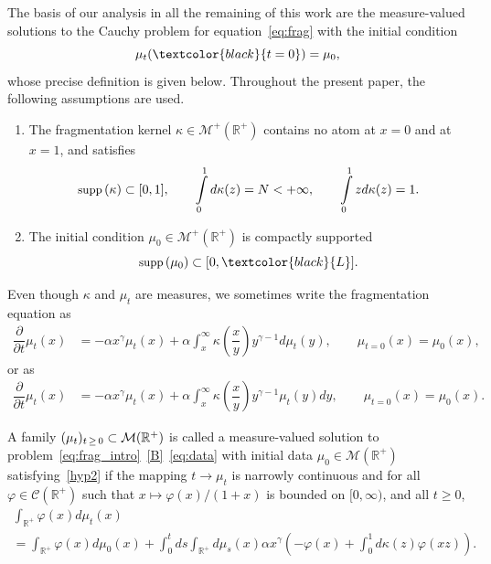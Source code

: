 \documentclass[AHL,Unicode,longabstracts,published]{cedram}
\newcommand*\dst{\displaystyle}
\newcommand*\p{\partial}
\renewcommand*\a{\alpha}
\newcommand*\R{\mathbb{R}}
\newcommand*\M{\mathcal{M}}
\newcommand{\clC}{\mathcal{C}}
\newcommand{\MT}[1]{\textcolor{black}{#1}}
\newcommand*\supp{{\mbox{\small\rm supp}}\,}
\newcommand*{\Hypenumi}{\renewcommand*{\theenumi}{\textbf{Hyp-\arabic{enumi}}}}
\begin{document}
The basis of our analysis in all the remaining of this work are the measure-valued solutions to the Cauchy problem for equation~\ref{eq:frag} with the initial condition
\begin{equation}\label{eq:data}
\mu _t(\MT{t=0})=\mu _0,
\end{equation}
whose precise definition is given below. Throughout the present paper, the following assumptions are used.
\begin{enumerate}\Hypenumi
\item \label{hyp1}
The fragmentation kernel $\kappa \in \M^+(\R^+)$ contains no atom at $x=0$ and at $x=1$, and satisfies
\begin{equation}
\supp(\kappa)\subset [0,1], \qquad \int\limits_0^1d\kappa(z) =N<+\infty, \qquad \int\limits_0^1 z d\kappa(z)=1.
\end{equation}
\item \label{hyp2}
The initial condition $\mu_0 \in \M^+(\R^+)$ is compactly supported
\begin{equation}
\supp(\mu_0)\subset [0,\MT{L}].
\end{equation}
\end{enumerate}


Even though $\kappa$ and $\mu_t$ are measures, we sometimes write the fragmentation equation as
\begin{equation}\label{eq:frag}
\begin{aligned}
\dfrac{\p}{\p t}\mu_t (x)& =- \a x^{\gamma}\mu_t(x) + \alpha \dst\int_{x}^{\infty}\kappa\left(\dfrac{x}{y} \right)y^{\gamma-1} d\mu_t(y),\qquad
\mu_{t=0}(x) = \mu_0(x),
\end{aligned}
\end{equation}
or as
\begin{equation*}\label{eq:frag2}
\begin{aligned}
\dfrac{\p}{\p t}\mu_t (x)& =- \a x^{\gamma}\mu_t(x) + \alpha \dst\int_{x}^{\infty}\kappa\left(\dfrac{x}{y} \right)y^{\gamma-1} \mu_t(y)dy,\qquad
\mu_{t=0}(x) = \mu_0(x).
\end{aligned}
\end{equation*}

\begin{defi}\label{def:measure_valued_sol}
A family $(\mu_t)_{t\,\geq\,0} \subset \M\linebreak(\R^+)$ is called a measure-valued solution to problem~\eqref{eq:frag_intro}~\eqref{B}~\eqref{eq:data} with initial data $\mu_0 \in \M(\R^+)$ satisfying~\eqref{hyp2} if the mapping $t\to \mu_t$ is narrowly continuous and for all $\varphi \in \clC(\R^+)$ such that $x\mapsto \varphi(x)/(1+x)$ is bounded on $[0,\infty)$, and all $t \geq 0$,
\begin{multline}\label{ppcm1}
\int_{\R^+} \varphi(x) d\mu_t(x)\\
= \int_{\R^+} \varphi(x) d\mu_0(x) + \dst\int_0^t ds \dst\int_{\R^+} d\mu_s(x) \alpha x^{\gamma}\left(- \varphi(x) + \dst\int_{0}^{1} d\kappa(z)\varphi(xz)\right).
\end{multline}
\end{defi}
\end{document}
